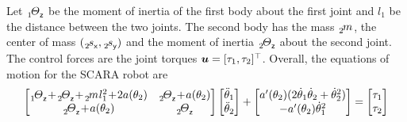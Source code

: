 Let $\bodyMOICoeff{}{1}{\idxZ}$ be the moment of inertia of the first body about the first joint and $l_1$ be the distance between the two joints.
The second body has the mass $\bodyMass{}{2}$, the center of mass $(\bodyCOMCoeff{}{2}{\idxX}, \bodyCOMCoeff{}{2}{\idxY})$ and the moment of inertia $\bodyMOICoeff{}{2}{\idxZ}$ about the second joint.
The control forces are the joint torques $\boldsymbol{u} = [\tau_1, \tau_2]^\top$.
Overall, the equations of motion for the SCARA robot are
\begin{align}
 \begin{bmatrix}
  \bodyMOICoeff{}{1}{\idxZ} \!+\! \bodyMOICoeff{}{2}{\idxZ} \!+\! \bodyMass{}{2} l_1^2 \!+\! 2 a(\jointAngle[2]) & \bodyMOICoeff{}{2}{\idxZ} \!+\! a(\jointAngle[2]) \\ 
  \bodyMOICoeff{}{2}{\idxZ} \!+\! a(\jointAngle[2]) & \bodyMOICoeff{}{2}{\idxZ}
 \end{bmatrix}
 \begin{bmatrix} \jointAngledd[1] \\ \jointAngledd[2] \end{bmatrix}
 +
 \begin{bmatrix}
   a'(\jointAngle[2]) (2\jointAngled[1] \jointAngled[2] + \jointAngled[2]^2) \\
  -a'(\jointAngle[2]) \jointAngled[1]^2
 \end{bmatrix}
 = \begin{bmatrix} \tau_1 \\ \tau_2 \end{bmatrix}
\end{align}
